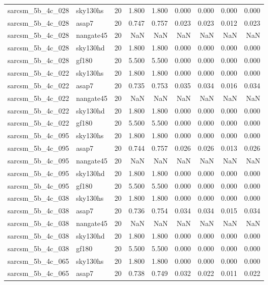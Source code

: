 \begin{tabular}{llrrrrrrr}
sarcsm\_5b\_4c\_028 & sky130hs & 20 & 1.800 & 1.800 & 0.000 & 0.000 & 0.000 & 0.000 \\
sarcsm\_5b\_4c\_028 & asap7 & 20 & 0.747 & 0.757 & 0.023 & 0.023 & 0.012 & 0.023 \\
sarcsm\_5b\_4c\_028 & nangate45 & 20 & NaN & NaN & NaN & NaN & NaN & NaN \\
sarcsm\_5b\_4c\_028 & sky130hd & 20 & 1.800 & 1.800 & 0.000 & 0.000 & 0.000 & 0.000 \\
sarcsm\_5b\_4c\_028 & gf180 & 20 & 5.500 & 5.500 & 0.000 & 0.000 & 0.000 & 0.000 \\
sarcsm\_5b\_4c\_022 & sky130hs & 20 & 1.800 & 1.800 & 0.000 & 0.000 & 0.000 & 0.000 \\
sarcsm\_5b\_4c\_022 & asap7 & 20 & 0.735 & 0.753 & 0.035 & 0.034 & 0.016 & 0.034 \\
sarcsm\_5b\_4c\_022 & nangate45 & 20 & NaN & NaN & NaN & NaN & NaN & NaN \\
sarcsm\_5b\_4c\_022 & sky130hd & 20 & 1.800 & 1.800 & 0.000 & 0.000 & 0.000 & 0.000 \\
sarcsm\_5b\_4c\_022 & gf180 & 20 & 5.500 & 5.500 & 0.000 & 0.000 & 0.000 & 0.000 \\
sarcsm\_5b\_4c\_095 & sky130hs & 20 & 1.800 & 1.800 & 0.000 & 0.000 & 0.000 & 0.000 \\
sarcsm\_5b\_4c\_095 & asap7 & 20 & 0.744 & 0.757 & 0.026 & 0.026 & 0.013 & 0.026 \\
sarcsm\_5b\_4c\_095 & nangate45 & 20 & NaN & NaN & NaN & NaN & NaN & NaN \\
sarcsm\_5b\_4c\_095 & sky130hd & 20 & 1.800 & 1.800 & 0.000 & 0.000 & 0.000 & 0.000 \\
sarcsm\_5b\_4c\_095 & gf180 & 20 & 5.500 & 5.500 & 0.000 & 0.000 & 0.000 & 0.000 \\
sarcsm\_5b\_4c\_038 & sky130hs & 20 & 1.800 & 1.800 & 0.000 & 0.000 & 0.000 & 0.000 \\
sarcsm\_5b\_4c\_038 & asap7 & 20 & 0.736 & 0.754 & 0.034 & 0.034 & 0.015 & 0.034 \\
sarcsm\_5b\_4c\_038 & nangate45 & 20 & NaN & NaN & NaN & NaN & NaN & NaN \\
sarcsm\_5b\_4c\_038 & sky130hd & 20 & 1.800 & 1.800 & 0.000 & 0.000 & 0.000 & 0.000 \\
sarcsm\_5b\_4c\_038 & gf180 & 20 & 5.500 & 5.500 & 0.000 & 0.000 & 0.000 & 0.000 \\
sarcsm\_5b\_4c\_065 & sky130hs & 20 & 1.800 & 1.800 & 0.000 & 0.000 & 0.000 & 0.000 \\
sarcsm\_5b\_4c\_065 & asap7 & 20 & 0.738 & 0.749 & 0.032 & 0.022 & 0.011 & 0.022 \\

\end{tabular}
